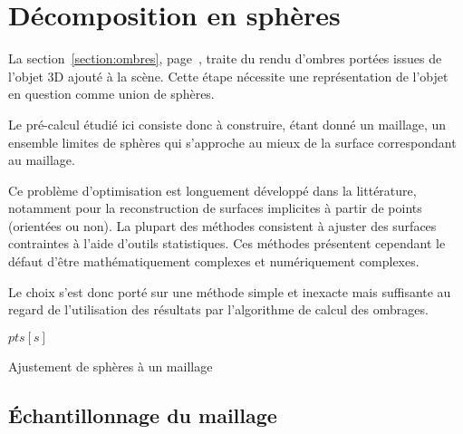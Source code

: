 \documentclass[10pt,a4paper,twoside, twocolumn]{report}
\begin{document}
\section{Décomposition en sphères}\label{section:precomputation_spheres}
La section~\ref{section:ombres}, page~\pageref{section:ombres}, traite du rendu d'ombres portées issues de l'objet 3D ajouté à la scène. Cette étape nécessite une représentation de l'objet en question comme union de sphères.

Le pré-calcul étudié ici consiste donc à construire, étant donné un maillage, un ensemble limites de sphères qui s'approche au mieux de la surface correspondant au maillage.

Ce problème d'optimisation est longuement développé dans la littérature\cite{Marshall1997}\cite{Gross2003}, notamment pour la reconstruction de surfaces implicites à partir de points (orientées ou non). La plupart des méthodes consistent à ajuster des surfaces contraintes à l'aide d'outils statistiques. Ces méthodes présentent cependant le défaut d’être mathématiquement complexes et numériquement complexes.

Le choix s'est donc porté sur une méthode simple et inexacte mais suffisante au regard de l'utilisation des résultats par l'algorithme de calcul des ombrages.

\begin{algorithm}[ht]

	\BlankLine
	\Point $pts[s]$\;
	\BlankLine
	\BlankLine
	\;
	\caption{Ajustement de sphères à un maillage}
\end{algorithm}

\subsection{Échantillonnage du maillage}
\end{document}
